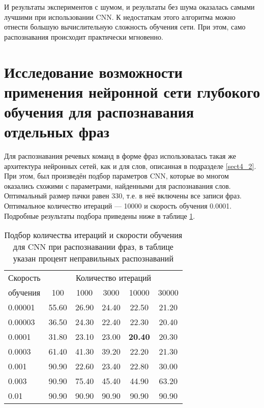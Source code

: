 И результаты экспериментов с шумом, и результаты без шума оказалась самыми лучшими при использовании CNN.
К недостаткам этого алгоритма можно отнести большую вычислительную сложность обучения сети.
При этом, само распознавания происходит практически мгновенно.

\clearpage


\section{Исследование возможности применения нейронной сети глубокого обучения для распознавания отдельных фраз} \label{sect4_5}

Для распознавания речевых команд в форме фраз использовалась такая же архитектура нейронных сетей, как и для слов, описанная в подразделе \ref{sect4_2}.
При этом, был произведён подбор параметров CNN, которые во многом оказались схожими с параметрами, найденными для распознавания слов.
Оптимальный размер пачки равен 330, т.е. в неё включены все записи фраз.
Оптимальное количество итераций --- 10000 и скорость обучения 0.0001.
Подробные результаты подбора приведены ниже в таблице \ref{tab:cnn_phrases_bf_iter_pace}.

\begin{table}[h]
	\centering
	\caption{Подбор количества итераций и скорости обучения для CNN при распознавании фраз, в таблице указан процент неправильных распознаваний}
	\label{tab:cnn_phrases_bf_iter_pace}
	\begin{tabular}{| l | c | c | c | c | c |}
		\hline
		Скорость & \multicolumn{5}{c|}{Количество итераций} \\
		\hhline{~-----}
		обучения \phantom{00} & \phantom{000} 100 \phantom{000} & \phantom{000}1000\phantom{000} & \phantom{000}3000\phantom{000} & \phantom{00} 10000 \phantom{00} & \phantom{00} 30000 \phantom{00} \\
		\hline
		0.00001	& 55.60 & 26.90 & 24.40 & 22.50 & 21.20 \\
		0.00003	& 36.50 & 24.30 & 22.40 & 22.30 & 20.40 \\
		0.0001	& 31.80 & 23.10 & 23.00 & \textbf{20.40} & 20.30 \\
		0.0003	& 61.40 & 41.30 & 39.20 & 22.20 & 21.30 \\
		0.001	& 90.90 & 22.60 & 23.40 & 22.80 & 30.00 \\
		0.003	& 90.90 & 75.40 & 45.40 & 44.90 & 63.20 \\
		0.01	& 90.90 & 90.90 & 90.90 & 90.90 & 90.90 \\
		\hline
	\end{tabular}
\end{table}

